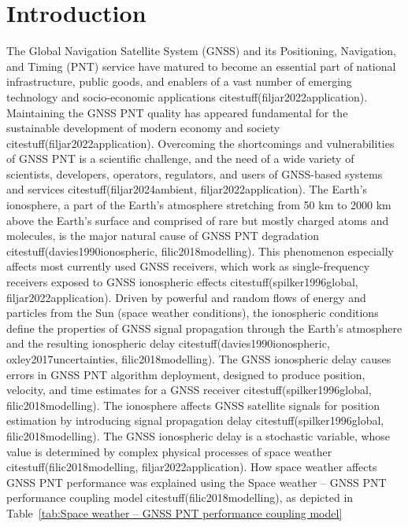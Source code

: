 \documentclass[preprint,12pt]{elsarticle}
\begin{document}
\section{Introduction}

The Global Navigation Satellite System (GNSS) and its Positioning, Navigation, and Timing (PNT) service have matured to become an essential part of national infrastructure, public goods, and enablers of a vast number of emerging technology and socio-economic applications citestuff(filjar2022application). Maintaining the GNSS PNT quality has appeared fundamental for the sustainable development of modern economy and society citestuff(filjar2022application). Overcoming the shortcomings and vulnerabilities of GNSS PNT is a scientific challenge, and the need of a wide variety of scientists, developers, operators, regulators, and users of GNSS-based systems and services citestuff(filjar2024ambient, filjar2022application). The Earth’s ionosphere, a part of the Earth’s atmosphere stretching from 50 km to 2000 km above the Earth’s surface and comprised of rare but mostly charged atoms and molecules, is the major natural cause of GNSS PNT degradation citestuff(davies1990ionospheric, filic2018modelling). This phenomenon especially affects most currently used GNSS receivers, which work as single-frequency receivers exposed to GNSS ionospheric effects citestuff(spilker1996global, filjar2022application). Driven by powerful and random flows of energy and particles from the Sun (space weather conditions), the ionospheric conditions define the properties of GNSS signal propagation through the Earth’s atmosphere and the resulting ionospheric delay citestuff(davies1990ionospheric, oxley2017uncertainties, filic2018modelling). The GNSS ionospheric delay causes errors in GNSS PNT algorithm deployment, designed to produce position, velocity, and time estimates for a GNSS receiver citestuff(spilker1996global, filic2018modelling). The ionosphere affects GNSS satellite signals for position estimation by introducing signal propagation delay citestuff(spilker1996global, filic2018modelling). The GNSS ionospheric delay is a stochastic variable, whose value is determined by complex physical processes of space weather citestuff(filic2018modelling, filjar2022application). How space weather affects GNSS PNT performance was explained using the Space weather – GNSS PNT performance coupling model citestuff(filic2018modelling), as depicted in Table~\ref{tab:Space weather – GNSS PNT performance coupling model}
\end{document}
